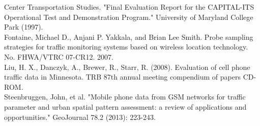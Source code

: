 \documentclass[hidelinks,12pt]{article}
\begin{document}
	\noindent Center Transportation Studies. "Final Evaluation Report for the CAPITAL-ITS Operational Test and Demonstration Program." University of Maryland College Park (1997).\\
	
	\noindent Fontaine, Michael D., Anjani P. Yakkala, and Brian Lee Smith. Probe sampling strategies for traffic monitoring systems based on wireless location technology. No. FHWA/VTRC 07-CR12. 2007.\\
	
	\noindent Liu, H. X., Danczyk, A., Brewer, R., Starr, R. (2008). Evaluation of cell phone traffic data in Minnesota. TRB 87th annual meeting compendium of papers CD-ROM.\\
	
	\noindent Steenbruggen, John, et al. "Mobile phone data from GSM networks for traffic parameter and urban spatial pattern assessment: a review of applications and opportunities." GeoJournal 78.2 (2013): 223-243.\\
	
	\clearpage
	\appendix
\end{document}
